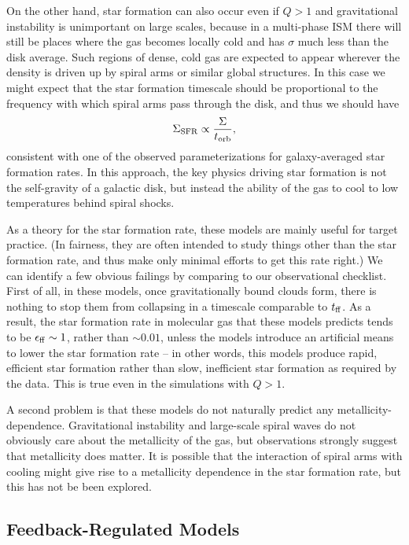 On the other hand, star formation can also occur even if $Q > 1$ and gravitational instability is unimportant on large scales, because in a multi-phase ISM there will still be places where the gas becomes locally cold and has $\sigma$ much less than the disk average. Such regions of dense, cold gas are expected to appear wherever the density is driven up by spiral arms or similar global structures. In this case we might expect that the star formation timescale should be proportional to the frequency with which spiral arms pass through the disk, and thus we should have
\begin{equation}
\Sigma_{\rm SFR} \propto \frac{\Sigma}{t_{\rm orb}},
\end{equation}
consistent with one of the observed parameterizations for galaxy-averaged star formation rates. In this approach, the key physics driving star formation is not the self-gravity of a galactic disk, but instead the ability of the gas to cool to low temperatures behind spiral shocks.

As a theory for the star formation rate, these models are mainly useful for target practice. (In fairness, they are often intended to study things other than the star formation rate, and thus make only minimal efforts to get this rate right.) We can identify a few obvious failings by comparing to our observational checklist. First of all, in these models, once gravitationally bound clouds form, there is nothing to stop them from collapsing in a timescale comparable to $t_{\rm ff}$. As a result, the star formation rate in molecular gas that these models predicts tends to be $\epsilon_{\rm ff} \sim 1$, rather than $\sim 0.01$, unless the models introduce an artificial means to lower the star formation rate -- in other words, this models produce rapid, efficient star formation rather than slow, inefficient star formation as required by the data. This is true even in the simulations with $Q>1$.

A second problem is that these models do not naturally predict any metallicity-dependence. Gravitational instability and large-scale spiral waves do not obviously care about the metallicity of the gas, but observations strongly suggest that metallicity does matter. It is possible that the interaction of spiral arms with cooling might give rise to a metallicity dependence in the star formation rate, but this has not be been explored.


\subsection{Feedback-Regulated Models}

